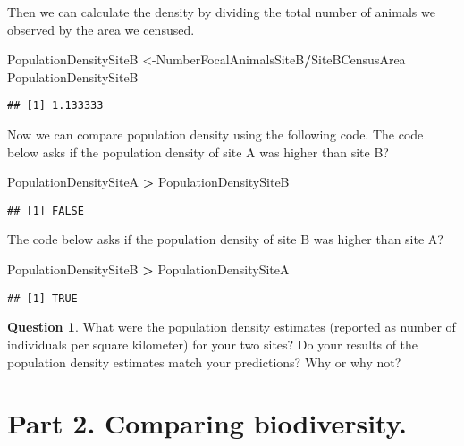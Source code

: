 \documentclass[]{book}
\newenvironment{Shaded}{\begin{snugshade}}{\end{snugshade}}
\newcommand{\NormalTok}[1]{#1}
\newcommand{\OperatorTok}[1]{\textcolor[rgb]{0.81,0.36,0.00}{\textbf{#1}}}
\newcommand{\StringTok}[1]{\textcolor[rgb]{0.31,0.60,0.02}{#1}}
\begin{document}
Then we can calculate the density by dividing the total number of animals we observed by the area we censused.

\begin{Shaded}
\begin{Highlighting}[]
\NormalTok{PopulationDensitySiteB <-NumberFocalAnimalsSiteB}\OperatorTok{/}\NormalTok{SiteBCensusArea}
\NormalTok{PopulationDensitySiteB}
\end{Highlighting}
\end{Shaded}

\begin{verbatim}
## [1] 1.133333
\end{verbatim}

Now we can compare population density using the following code. The code below asks if the population density of site A was higher than site B?

\begin{Shaded}
\begin{Highlighting}[]
\NormalTok{PopulationDensitySiteA }\OperatorTok{>}\StringTok{ }\NormalTok{PopulationDensitySiteB}
\end{Highlighting}
\end{Shaded}

\begin{verbatim}
## [1] FALSE
\end{verbatim}

The code below asks if the population density of site B was higher than site A?

\begin{Shaded}
\begin{Highlighting}[]
\NormalTok{PopulationDensitySiteB }\OperatorTok{>}\StringTok{ }\NormalTok{PopulationDensitySiteA}
\end{Highlighting}
\end{Shaded}

\begin{verbatim}
## [1] TRUE
\end{verbatim}

\textbf{Question 1}. What were the population density estimates (reported as number of individuals per square kilometer) for your two sites? Do your results of the population density estimates match your predictions? Why or why not?

\hypertarget{part-2.-comparing-biodiversity.}{%
\section*{Part 2. Comparing biodiversity.}\label{part-2.-comparing-biodiversity.}}
\end{document}
